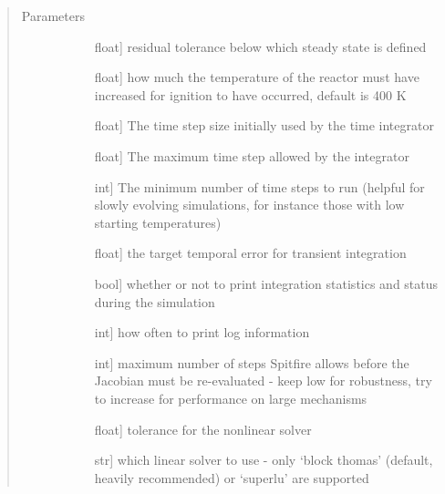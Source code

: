 \documentclass[letterpaper,10pt,english]{sphinxmanual}
\begin{document}
\begin{fulllineitems}
\begin{fulllineitems}
\begin{description}
\end{description}
\begin{quote}\begin{description}
\item[{Parameters}] \leavevmode\begin{description}
\item[{}] \leavevmode{[}float{]}
residual tolerance below which steady state is defined

\item[{}] \leavevmode{[}float{]}
how much the temperature of the reactor must have increased for ignition to have occurred, default is 400 K

\item[{}] \leavevmode{[}float{]}
The time step size initially used by the time integrator

\item[{}] \leavevmode{[}float{]}
The maximum time step allowed by the integrator

\item[{}] \leavevmode{[}int{]}
The minimum number of time steps to run (helpful for slowly evolving simulations, for instance those with low starting temperatures)

\item[{}] \leavevmode{[}float{]}
the target temporal error for transient integration

\item[{}] \leavevmode{[}bool{]}
whether or not to print integration statistics and status during the simulation

\item[{}] \leavevmode{[}int{]}
how often to print log information

\item[{}] \leavevmode{[}int{]}
maximum number of steps Spitfire allows before the Jacobian must be re-evaluated - keep low for robustness, try to increase for performance on large mechanisms

\item[{}] \leavevmode{[}float{]}
tolerance for the nonlinear solver

\item[{}] \leavevmode{[}str{]}
which linear solver to use - only ‘block thomas’ (default, heavily recommended) or ‘superlu’ are supported


\end{description}
\end{description}
\end{quote}
\end{fulllineitems}
\end{fulllineitems}
\end{document}
